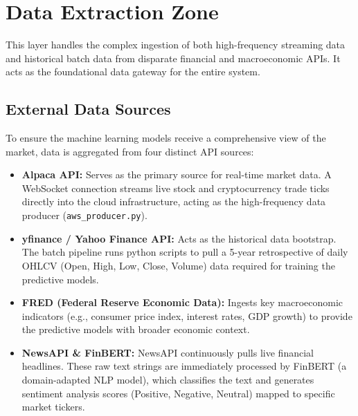 \documentclass[11pt,a4paper]{article}
\begin{document}
\section{Data Extraction Zone}
This layer handles the complex ingestion of both high-frequency streaming data and historical batch data from disparate financial and macroeconomic APIs. It acts as the foundational data gateway for the entire system.

\subsection{External Data Sources}
To ensure the machine learning models receive a comprehensive view of the market, data is aggregated from four distinct API sources:
\begin{itemize}[leftmargin=*]
    \item \textbf{Alpaca API:} Serves as the primary source for real-time market data. A WebSocket connection streams live stock and cryptocurrency trade ticks directly into the cloud infrastructure, acting as the high-frequency data producer (\texttt{aws\_producer.py}).
    \item \textbf{yfinance / Yahoo Finance API:} Acts as the historical data bootstrap. The batch pipeline runs python scripts to pull a 5-year retrospective of daily OHLCV (Open, High, Low, Close, Volume) data required for training the predictive models.
    \item \textbf{FRED (Federal Reserve Economic Data):} Ingests key macroeconomic indicators (e.g., consumer price index, interest rates, GDP growth) to provide the predictive models with broader economic context.
    \item \textbf{NewsAPI \& FinBERT:} NewsAPI continuously pulls live financial headlines. These raw text strings are immediately processed by FinBERT (a domain-adapted NLP model), which classifies the text and generates sentiment analysis scores (Positive, Negative, Neutral) mapped to specific market tickers.
\end{itemize}
\end{document}
